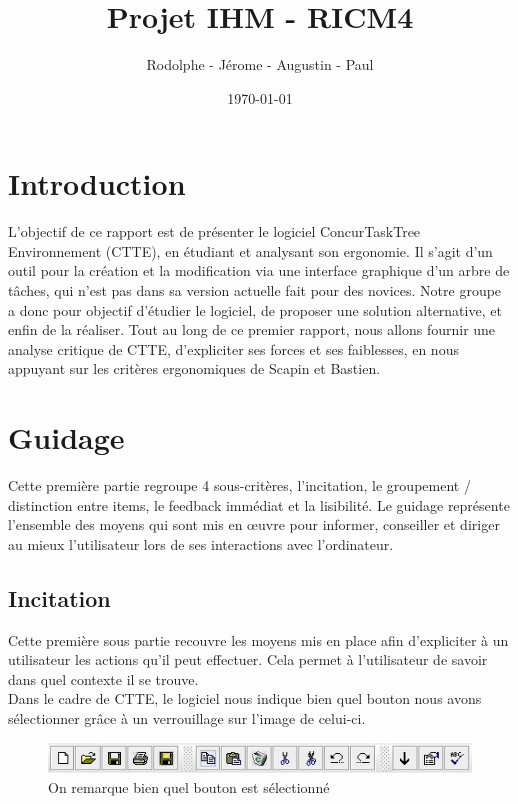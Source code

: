 \documentclass[12pt, a4paper]{article}
\title{Projet IHM - RICM4}
\author{\bsc{Fréby} Rodolphe - \bsc{Barbier} Jérome - \bsc{Husson} Augustin - \bsc{Labat} Paul}
\date{\today}
\begin{document}
\maketitle
\tableofcontents
\newpage

\section{Introduction}
L'objectif de ce rapport est de présenter le logiciel ConcurTaskTree Environnement (CTTE), en étudiant et analysant son ergonomie. Il s'agit d'un outil pour la création et la modification via une interface graphique d'un arbre de tâches, qui n'est pas dans sa version actuelle fait pour des novices. Notre groupe a donc pour objectif d'étudier le logiciel, de proposer une solution alternative, et enfin de la réaliser. Tout au long de ce premier rapport, nous allons fournir une analyse critique de CTTE, d'expliciter ses forces et ses faiblesses, en nous appuyant sur les critères ergonomiques de Scapin et Bastien.  

\section{Guidage}
Cette première partie regroupe 4 sous-critères, l'incitation, le groupement / distinction entre items, le feedback immédiat et la lisibilité. Le guidage représente l'ensemble des moyens qui sont mis en œuvre pour informer, conseiller et diriger au mieux l'utilisateur lors de ses interactions avec l'ordinateur. 

\subsection{Incitation}
Cette première sous partie recouvre les moyens mis en place afin d'expliciter à un utilisateur les actions qu'il peut effectuer. Cela permet à l'utilisateur de savoir dans quel contexte il se trouve.\\

Dans le cadre de CTTE, le logiciel nous indique bien quel bouton nous avons sélectionner grâce à un verrouillage sur l'image de celui-ci. 


\begin{figure}[h]
\begin{center}
   \includegraphics{incitation.jpg}
	\caption{On remarque bien quel bouton est sélectionné}
	\end{center}
\end{figure}
\end{document}
